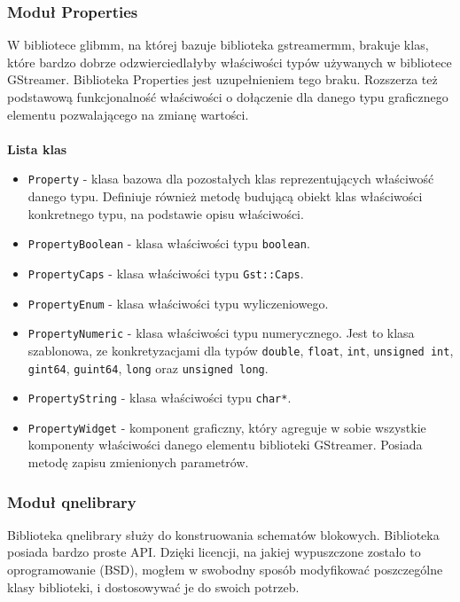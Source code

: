 \documentclass[12pt]{article}
\begin{document}
\subsubsection{Moduł Properties}
W bibliotece glibmm, na której bazuje biblioteka gstreamermm, brakuje klas, które bardzo dobrze odzwierciedlałyby właściwości typów używanych w bibliotece GStreamer. Biblioteka Properties jest uzupełnieniem tego braku. Rozszerza też podstawową funkcjonalność właściwości o dołączenie dla  danego typu graficznego elementu pozwalającego na zmianę wartości. 
\paragraph{}
\textbf{Lista klas}
\vspace{-2mm}
\begin{itemize}
  \setlength{\itemsep}{0em}
\item \texttt{Property} - klasa bazowa dla pozostałych klas reprezentujących właściwość danego typu. Definiuje również metodę budującą obiekt  klas właściwości konkretnego typu, na podstawie opisu właściwości.
\item \texttt{PropertyBoolean} - klasa właściwości typu \texttt{boolean}.
\item \texttt{PropertyCaps} - klasa właściwości typu \texttt{Gst::Caps}.
\item \texttt{PropertyEnum} - klasa właściwości typu wyliczeniowego.
\item \texttt{PropertyNumeric} - klasa właściwości typu numerycznego. Jest to klasa szablonowa, ze konkretyzacjami dla typów \texttt{double}, \texttt{float}, \texttt{int}, \texttt{unsigned int}, \texttt{gint64}, \texttt{guint64}, \texttt{long} oraz \texttt{unsigned long}.
\item \texttt{PropertyString} - klasa właściwości typu \texttt{char*}.
\item \texttt{PropertyWidget} - komponent graficzny, który agreguje w sobie wszystkie komponenty właściwości danego elementu biblioteki GStreamer. Posiada metodę zapisu zmienionych parametrów.
\end{itemize}
\subsubsection{Moduł qnelibrary}
Biblioteka qnelibrary\cite{algoholic} służy do konstruowania schematów blokowych. Biblioteka posiada bardzo proste API. Dzięki licencji, na jakiej wypuszczone zostało to oprogramowanie (BSD), mogłem w swobodny sposób modyfikować poszczególne klasy biblioteki, i dostosowywać je do swoich potrzeb.
\end{document}
